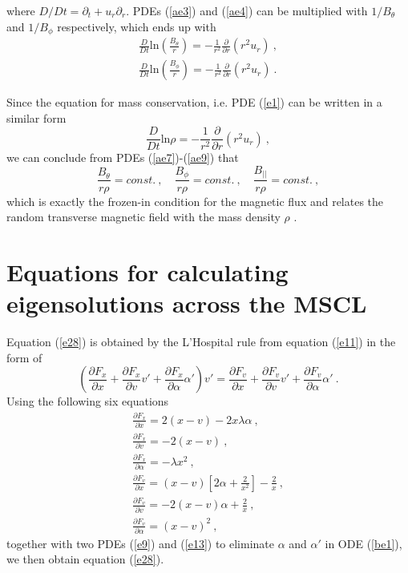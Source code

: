 \documentclass[fleqn,usenatbib]{mnras}
\begin{document}
where $D/Dt=\partial_{t}+u_{r}\partial_{r}$. PDEs (\ref{ae3}) and (\ref{ae4}) can be multiplied with $1/B_{\theta}$ and $1/B_{\phi}$ respectively, which ends up with
\begin{gather}
\frac{D}{Dt}\mathrm{ln}\left(\frac{B_{\theta}}{r}\right)=-\frac{1}{r^{2}}\frac{\partial}{\partial r}\left(r^{2}u_{r}\right)\ ,\label{ae7}\\
\frac{D}{Dt}\mathrm{ln}\left(\frac{B_{\phi}}{r}\right)=-\frac{1}{r^{2}}\frac{\partial}{\partial r}\left(r^{2}u_{r}\right)\ .\label{ae8}
\end{gather}

Since the equation for mass conservation, i.e. PDE (\ref{e1}) can be written in a similar form
\begin{equation}
\frac{D}{Dt}\mathrm{ln}\rho=-\frac{1}{r^{2}}\frac{\partial}{\partial r}\left(r^{2}u_{r}\right)\ ,\label{ae9}
\end{equation}
we can conclude from PDEs (\ref{ae7})-(\ref{ae9}) that
\begin{equation}
\frac{B_{\theta}}{r\rho}=const.\ , \quad \frac{B_{\phi}}{r\rho}=const.\ , \quad \frac{B_{||}}{r\rho}=const.\ ,
\end{equation}
which is exactly the frozen-in condition for the magnetic flux and relates the random transverse magnetic field with the mass density $\rho$ \citep{yuLou2005}.

\section{Equations for calculating eigensolutions across the MSCL}
\label{a2}
Equation (\ref{e28}) is obtained by the L'Hospital rule from equation (\ref{e11}) in the form of 
\begin{equation}
\left(\frac{\partial F_{x}}{\partial x}+\frac{\partial F_{x}}{\partial v}v'+\frac{\partial F_{x}}{\partial \alpha}\alpha'\right) v'=\frac{\partial F_{v}}{\partial x}+\frac{\partial F_{v}}{\partial v}v'+\frac{\partial F_{v}}{\partial \alpha}\alpha'\ .\label{be1}
\end{equation}
Using the following six equations
\begin{gather}
\frac{\partial F_{x}}{\partial x}=2(x-v)-2x\lambda\alpha\ ,\\
\frac{\partial F_{x}}{\partial v}=-2(x-v)\ ,\\
\frac{\partial F_{x}}{\partial \alpha}=-\lambda x^{2}\ ,\\
\frac{\partial F_{v}}{\partial x}=(x-v)\left[2\alpha+\frac{2}{x^{2}}\right]-\frac{2}{x}\ ,\\
\frac{\partial F_{v}}{\partial v}=-2(x-v)\alpha+\frac{2}{x}\ ,\\
\frac{\partial F_{v}}{\partial \alpha}=(x-v)^{2}\ ,
\end{gather}
together with two PDEs (\ref{e9}) and (\ref{e13}) to eliminate $\alpha$ and $\alpha'$ in ODE (\ref{be1}), we then obtain equation (\ref{e28}).
\end{document}
